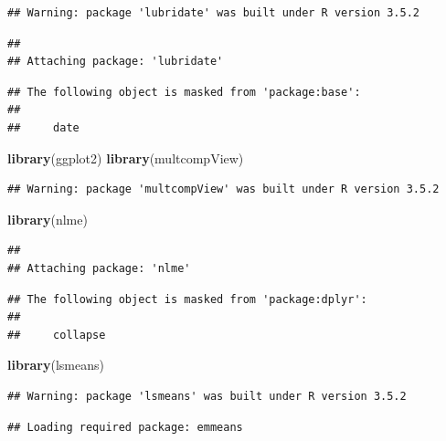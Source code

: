 \documentclass[12pt,]{article}
\newenvironment{Shaded}{\begin{snugshade}}{\end{snugshade}}
\newcommand{\KeywordTok}[1]{\textcolor[rgb]{0.13,0.29,0.53}{\textbf{#1}}}
\newcommand{\NormalTok}[1]{#1}
\begin{document}
\begin{verbatim}
## Warning: package 'lubridate' was built under R version 3.5.2
\end{verbatim}

\begin{verbatim}
## 
## Attaching package: 'lubridate'
\end{verbatim}

\begin{verbatim}
## The following object is masked from 'package:base':
## 
##     date
\end{verbatim}

\begin{Shaded}
\begin{Highlighting}[]
\KeywordTok{library}\NormalTok{(ggplot2)}
\KeywordTok{library}\NormalTok{(multcompView)}
\end{Highlighting}
\end{Shaded}

\begin{verbatim}
## Warning: package 'multcompView' was built under R version 3.5.2
\end{verbatim}

\begin{Shaded}
\begin{Highlighting}[]
\KeywordTok{library}\NormalTok{(nlme)}
\end{Highlighting}
\end{Shaded}

\begin{verbatim}
## 
## Attaching package: 'nlme'
\end{verbatim}

\begin{verbatim}
## The following object is masked from 'package:dplyr':
## 
##     collapse
\end{verbatim}

\begin{Shaded}
\begin{Highlighting}[]
\KeywordTok{library}\NormalTok{(lsmeans)}
\end{Highlighting}
\end{Shaded}

\begin{verbatim}
## Warning: package 'lsmeans' was built under R version 3.5.2
\end{verbatim}

\begin{verbatim}
## Loading required package: emmeans
\end{verbatim}
\end{document}
